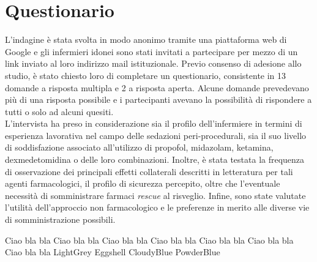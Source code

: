 \section{Questionario}

L'indagine è stata svolta in modo anonimo tramite una piattaforma web di Google e gli infermieri idonei sono stati invitati a partecipare per mezzo di un link inviato al loro indirizzo mail istituzionale. Previo consenso di adesione allo studio, è stato chiesto loro di completare un questionario, consistente in 13 domande a risposta multipla e 2 a risposta aperta. Alcune domande prevedevano più di una risposta possibile e i partecipanti avevano la possibilità di rispondere a tutti o solo ad alcuni quesiti. 
\\L'intervista ha preso in considerazione sia il profilo dell'infermiere in termini di esperienza lavorativa nel campo delle sedazioni peri-procedurali, sia il suo livello di soddisfazione associato all'utilizzo di propofol, midazolam, ketamina, dexmedetomidina o delle loro combinazioni. Inoltre, è stata testata la frequenza di osservazione dei principali effetti collaterali descritti in letteratura per tali agenti farmacologici, il profilo di sicurezza percepito, oltre che l'eventuale necessità di somministrare farmaci \emph{rescue} al risveglio. Infine, sono state valutate l'utilità dell'approccio non farmacologico e le preferenze in merito alle diverse vie di somministrazione possibili. 

\bigskip
\colorbox{Snow2}{Ciao bla bla} \colorbox{Seashell2}{Ciao bla bla} \colorbox{LightSteelBlue1}{Ciao bla bla} \colorbox{SlateGray1}{Ciao bla bla} \colorbox{Snow3}{Ciao bla bla} \colorbox{LavenderBlush1}{Ciao bla bla} \colorbox{Ivory2}{Ciao bla bla} \colorbox{xkcdLightGrey}{LightGrey} \colorbox{xkcdEggshell}{Eggshell} \colorbox{xkcdCloudyBlue!70}{CloudyBlue} \colorbox{xkcdPowderBlue}{PowderBlue}

